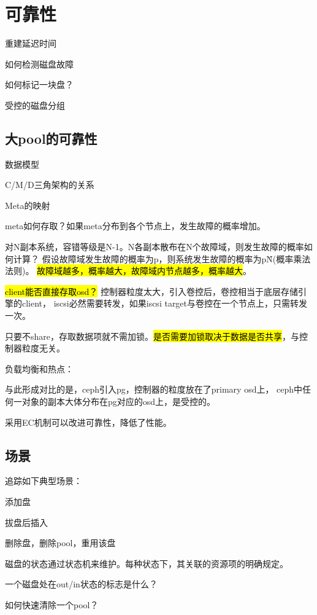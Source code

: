 \chapter{可靠性}

重建延迟时间

如何检测磁盘故障

如何标记一块盘？

受控的磁盘分组

\section{大pool的可靠性}

数据模型

C/M/D三角架构的关系

Meta的映射

meta如何存取？如果meta分布到各个节点上，发生故障的概率增加。

对N副本系统，容错等级是N-1。N各副本散布在N个故障域，则发生故障的概率如何计算？
假设故障域发生故障的概率为p，则系统发生故障的概率为p\^N(概率乘法法则)。
\hl{故障域越多，概率越大，故障域内节点越多，概率越大}。

\hl{client能否直接存取osd？}
控制器粒度太大，引入卷控后，卷控相当于底层存储引擎的client，
iscsi必然需要转发，如果iscsi target与卷控在一个节点上，只需转发一次。

只要不share，存取数据项就不需加锁。\hl{是否需要加锁取决于数据是否共享}，与控制器粒度无关。

负载均衡和热点：

与此形成对比的是，ceph引入pg，控制器的粒度放在了primary osd上，
ceph中任何一对象的副本大体分布在pg对应的osd上，是受控的。

采用EC机制可以改进可靠性，降低了性能。

\section{场景}

追踪如下典型场景：
\begin{enumbox}
\item 添加盘
\item 拔盘后插入
\item 删除盘，删除pool，重用该盘
\end{enumbox}

磁盘的状态通过状态机来维护。每种状态下，其关联的资源项的明确规定。

一个磁盘处在out/in状态的标志是什么？

如何快速清除一个pool？

